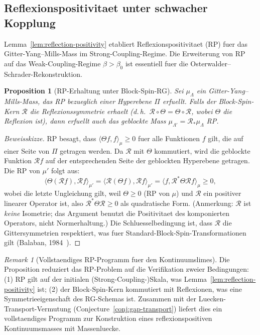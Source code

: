 \documentclass[12pt,a4paper]{article}
\theoremstyle{definition}
\theoremstyle{plain}
\newtheorem{proposition}[definition]{Proposition}
\theoremstyle{remark}
\newtheorem{remark}[definition]{Remark}
\begin{document}
\subsection{Reflexionspositivitaet unter schwacher Kopplung}
\label{sec:rp-weak}

Lemma~\ref{lem:reflection-positivity} etabliert Reflexionspositivitaet (RP) fuer das Gitter-Yang--Mills-Mass im Strong-Coupling-Regime. Die Erweiterung von RP auf das Weak-Coupling-Regime $\beta > \beta_0$ ist essentiell fuer die Osterwalder--Schrader-Rekonstruktion.

\begin{proposition}[RP-Erhaltung unter Block-Spin-RG]
\label{prop:rp-preservation}
Sei $\mu_\Lambda$ ein Gitter-Yang--Mills-Mass, das RP bezueglich einer Hyperebene $\Pi$ erfuellt. Falls der Block-Spin-Kern $\mathcal{R}$ die Reflexionssymmetrie erhaelt (d.\,h.\ $\mathcal{R} \circ \Theta = \Theta \circ \mathcal{R}$, wobei $\Theta$ die Reflexion ist), dann erfuellt auch das geblockte Mass $\mu_{\Lambda'} = \mathcal{R}_* \mu_\Lambda$ RP.
\end{proposition}

\begin{proof}[Beweisskizze]
RP besagt, dass $\langle \Theta f, f \rangle_{\mu} \geq 0$ fuer alle Funktionen $f$ gilt, die auf einer Seite von $\Pi$ getragen werden. Da $\mathcal{R}$ mit $\Theta$ kommutiert, wird die geblockte Funktion $\mathcal{R} f$ auf der entsprechenden Seite der geblockten Hyperebene getragen. Die RP von $\mu'$ folgt aus:
\[
\langle \Theta(\mathcal{R} f), \mathcal{R} f \rangle_{\mu'} = \langle \mathcal{R}(\Theta f), \mathcal{R} f \rangle_{\mu'} = \langle f, \mathcal{R}^* \Theta \mathcal{R} f \rangle_{\mu} \geq 0,
\]
wobei die letzte Ungleichung gilt, weil $\Theta \geq 0$ (RP von $\mu$) und $\mathcal{R}$ ein positiver linearer Operator ist, also $\mathcal{R}^* \Theta \mathcal{R} \geq 0$ als quadratische Form. (Anmerkung: $\mathcal{R}$ ist \emph{keine} Isometrie; das Argument benutzt die Positivitaet des komponierten Operators, nicht Normerhaltung.) Die Schluesselbedingung ist, dass $\mathcal{R}$ die Gittersymmetrien respektiert, was fuer Standard-Block-Spin-Transformationen gilt (Balaban, 1984~\cite{Balaban1985b}).
\end{proof}

\begin{remark}[Vollstaendiges RP-Programm fuer den Kontinuumslimes]
Die Proposition reduziert das RP-Problem auf die Verifikation zweier Bedingungen: (1) RP gilt auf der initialen (Strong-Coupling-)Skala, was Lemma~\ref{lem:reflection-positivity} ist; (2) der Block-Spin-Kern kommutiert mit Reflexionen, was eine Symmetrieeigenschaft des RG-Schemas ist. Zusammen mit der Luecken-Transport-Vermutung (Conjecture~\ref{conj:gap-transport}) liefert dies ein vollstaendiges Programm zur Konstruktion eines reflexionspositiven Kontinuumsmasses mit Massenluecke.
\end{remark}
\end{document}
